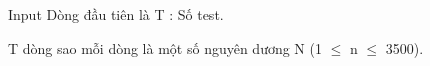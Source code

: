 Input
Dòng đầu tiên là T : Số test.

T dòng sao mỗi dòng là một số nguyên dương N (1 $\le$ n  $\le$ 3500).